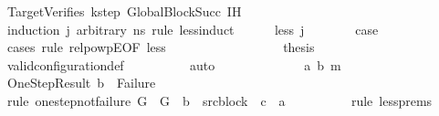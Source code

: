 \begin{isabellebody}
\ TargetVerifies\ k{\isacharunderscore}{\kern0pt}step\ GlobalBlockSucc\ IH\isanewline
\ \ \isamarkupfalse%
\ {\isacharparenleft}{\kern0pt}induction\ j\ arbitrary{\isacharcolon}{\kern0pt}\ ns\ rule{\isacharcolon}{\kern0pt}\ less{\isacharunderscore}{\kern0pt}induct{\isacharparenright}{\kern0pt}\isanewline
\ \ \ \ \isamarkupfalse%
\ {\isacharparenleft}{\kern0pt}less\ j{\isacharparenright}{\kern0pt}\isanewline
\ \ \ \ \isamarkupfalse%
\ \isamarkupfalse%
\ {\isacharquery}{\kern0pt}case\isanewline
\ \ \ \ \isamarkupfalse%
\ {\isacharparenleft}{\kern0pt}cases\ rule{\isacharcolon}{\kern0pt}\ relpowp{\isacharunderscore}{\kern0pt}E{}{\isacharunderscore}{\kern0pt}{}{\isacharbrackleft}{\kern0pt}OF\ less{\isacharparenleft}{\kern0pt}{}{\isacharparenright}{\kern0pt}{\isacharbrackright}{\kern0pt}{\isacharparenright}{\kern0pt}\isanewline
\ \ \ \ \ \ \isamarkupfalse%
\ {}\isanewline
\ \ \ \ \ \ \isamarkupfalse%
\ \isamarkupfalse%
\ {\isacharquery}{\kern0pt}thesis\isanewline
\ \ \ \ \ \ \ \ \isamarkupfalse%
\ valid{\isacharunderscore}{\kern0pt}configuration{\isacharunderscore}{\kern0pt}def\isanewline
\ \ \ \ \ \ \ \ \isamarkupfalse%
\ auto\isanewline
\ \ \ \ \isamarkupfalse%
\isanewline
\ \ \ \ \ \ \isamarkupfalse%
\ {\isacharparenleft}{\kern0pt}{}\ a\ b\ m{\isacharparenright}{\kern0pt}\isanewline
\ \ \ \ \ \ \isamarkupfalse%
\ OneStepResult{\isacharcolon}{\kern0pt}\ {\isachardoublequoteopen}b\ {\isasymnoteq}\ Failure{\isachardoublequoteclose}\isanewline
\ \ \ \ \ \ \ \ \isamarkupfalse%
\ {\isacharparenleft}{\kern0pt}rule\ one{\isacharunderscore}{\kern0pt}step{\isacharunderscore}{\kern0pt}not{\isacharunderscore}{\kern0pt}failure{\isacharbrackleft}{\kern0pt}\ {\isacharquery}{\kern0pt}G\ {\isacharequal}{\kern0pt}\ G\ \ {\isacharquery}{\kern0pt}b\ {\isacharequal}{\kern0pt}\ src{\isacharunderscore}{\kern0pt}block\ \ {\isacharquery}{\kern0pt}c\ {\isacharequal}{\kern0pt}\ a{\isacharbrackright}{\kern0pt}{\isacharparenright}{\kern0pt}\isanewline
\ \ \ \ \ \ \ \ \isamarkupfalse%
\ {\isacharparenleft}{\kern0pt}rule\ less{\isachardot}{\kern0pt}prems{\isacharparenleft}{\kern0pt}{}{\isacharparenright}{\kern0pt}{\isacharparenright}{\kern0pt}\isanewline

\end{isabellebody}
